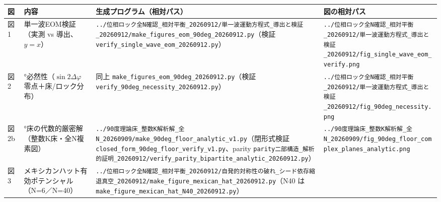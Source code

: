 \documentclass[
  a4paper,
]{ltjsarticle}
\newcounter{none} %
\begin{document}
{\def\LTcaptype{none} %
\begin{longtable}[]{@{}
  >{\raggedright\arraybackslash}p{}
  >{\raggedright\arraybackslash}p{}
  >{\raggedright\arraybackslash}p{}
  >{\raggedright\arraybackslash}p{}@{}}
\toprule\noalign{}
\begin{minipage}[b]{\linewidth}\raggedright
図
\end{minipage} & \begin{minipage}[b]{\linewidth}\raggedright
内容
\end{minipage} & \begin{minipage}[b]{\linewidth}\raggedright
生成プログラム（相対パス）
\end{minipage} & \begin{minipage}[b]{\linewidth}\raggedright
図の相対パス
\end{minipage} \\
\midrule\noalign{}
\endhead
\bottomrule\noalign{}
\endlastfoot
図1 & 単一波EOM検証（実測 vs 導出、\(y=x\)） &
\texttt{../位相ロック全N確認\_相対平衡\_20260912/単一波運動方程式\_導出と検証\_20260912/make\_figures\_eom\_90deg\_20260912.py}（検証
\texttt{verify\_single\_wave\_eom\_20260912.py}） &
\texttt{../位相ロック全N確認\_相対平衡\_20260912/単一波運動方程式\_導出と検証\_20260912/fig\_single\_wave\_eom\_verify.png} \\
図2 & 90°必然性（\(\sin2\Delta\varphi\) 零点＋床/ロック分布） & 同上
\texttt{make\_figures\_eom\_90deg\_20260912.py}（検証
\texttt{verify\_90deg\_necessity\_20260912.py}） &
\texttt{../位相ロック全N確認\_相対平衡\_20260912/単一波運動方程式\_導出と検証\_20260912/fig\_90deg\_necessity.png} \\
図2b & 90°床の代数的厳密解（整数K床・全N複素図） &
\texttt{../90度理論床\_整数K解析解\_全N\_20260909/make\_90deg\_floor\_analytic\_v1.py}（閉形式検証
\texttt{closed\_form\_90deg\_floor\_verify\_v1.py}、parity
\texttt{parity二部構造\_解析的証明\_20260912/verify\_parity\_bipartite\_analytic\_20260912.py}）
&
\texttt{../90度理論床\_整数K解析解\_全N\_20260909/fig\_90deg\_floor\_complex\_planes\_analytic.png} \\
図3 & メキシカンハット有効ポテンシャル（N=6／N=40） &
\texttt{../位相ロック全N確認\_相対平衡\_20260912/自発的対称性の破れ\_シード依存縮退真空\_20260912/make\_figure\_mexican\_hat\_20260912.py}（N40
は \texttt{make\_figure\_mexican\_hat\_N40\_20260912.py}） &

\end{longtable}}
\end{document}

